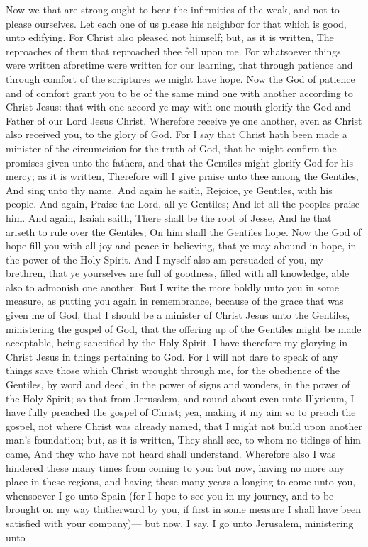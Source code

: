 Now we that are strong ought to bear the infirmities of the weak, and not to please ourselves. Let each one of us please his neighbor for that which is good, unto edifying. For Christ also pleased not himself; but, as it is written, The reproaches of them that reproached thee fell upon me. For whatsoever things were written aforetime were written for our learning, that through patience and through comfort of the scriptures we might have hope. Now the God of patience and of comfort grant you to be of the same mind one with another according to Christ Jesus: that with one accord ye may with one mouth glorify the God and Father of our Lord Jesus Christ. Wherefore receive ye one another, even as Christ also received you, to the glory of God. For I say that Christ hath been made a minister of the circumcision for the truth of God, that he might confirm the promises given unto the fathers, and that the Gentiles might glorify God for his mercy; as it is written, Therefore will I give praise unto thee among the Gentiles, And sing unto thy name.  And again he saith, Rejoice, ye Gentiles, with his people.  And again, Praise the Lord, all ye Gentiles; And let all the peoples praise him.  And again, Isaiah saith, There shall be the root of Jesse, And he that ariseth to rule over the Gentiles; On him shall the Gentiles hope.  Now the God of hope fill you with all joy and peace in believing, that ye may abound in hope, in the power of the Holy Spirit.  And I myself also am persuaded of you, my brethren, that ye yourselves are full of goodness, filled with all knowledge, able also to admonish one another. But I write the more boldly unto you in some measure, as putting you again in remembrance, because of the grace that was given me of God, that I should be a minister of Christ Jesus unto the Gentiles, ministering the gospel of God, that the offering up of the Gentiles might be made acceptable, being sanctified by the Holy Spirit. I have therefore my glorying in Christ Jesus in things pertaining to God. For I will not dare to speak of any things save those which Christ wrought through me, for the obedience of the Gentiles, by word and deed, in the power of signs and wonders, in the power of the Holy Spirit; so that from Jerusalem, and round about even unto Illyricum, I have fully preached the gospel of Christ; yea, making it my aim so to preach the gospel, not where Christ was already named, that I might not build upon another man’s foundation; but, as it is written, They shall see, to whom no tidings of him came, And they who have not heard shall understand.  Wherefore also I was hindered these many times from coming to you: but now, having no more any place in these regions, and having these many years a longing to come unto you, whensoever I go unto Spain (for I hope to see you in my journey, and to be brought on my way thitherward by you, if first in some measure I shall have been satisfied with your company)— but now, I say, I go unto Jerusalem, ministering unto 
